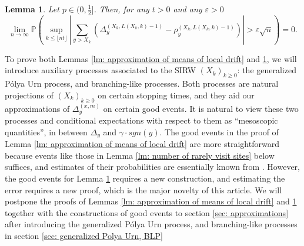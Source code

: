 \documentclass[twoside,12pt, a4paper]{article}
\newtheorem{lemma}{Lemma}[section]
\numberwithin{equation}{section}
\theoremstyle{remark}
\newcommand{\abs}[1]{\left\vert #1 \right\vert}
\newcommand{\edt}[1]{\textcolor{red}{#1}} %
\begin{document}
	\begin{lemma}\label{lm: approx local drift by conditional means}
		Let $p\in (0,\frac{1}{2}]$. Then, for any $t>0$ and any $\varepsilon >0$
		\begin{equation}\label{eq: control of martingale difference for local drift}
			\lim_{n \to \infty }\mathbb{P}\left(\sup_{k\leq\lfloor nt \rfloor} \abs{\sum_{y> X_k} \left(\Delta_{y}^{(X_k,L(X_k,k)-1)}- \rho_{y}^{(X_k,L(X_k,k)-1)} \right)   }  > \varepsilon \sqrt{n}  \right) =0. 
		\end{equation}
	\end{lemma}
	
	
	
	To prove both Lemmas \ref{lm: approximation of means of local drift} and \ref{lm: approx local drift by conditional means}, we will introduce auxiliary processes associated to the SIRW $(X_k)_{k\geq 0}$: the generalized P\'{o}lya Urn process, and branching-like processes. Both processes are natural projections of $(X_k)_{k\geq 0}$ on certain stopping times, and they aid our approximations of $\Delta_{y}^{(x,m)}$ on certain good events. 
	It is natural to view these two processes and conditional expectations with respect to them as ``mesoscopic quantities'', in between $\Delta_y$ and $\gamma\cdot sgn(y)$.
	The good events in the proof of Lemma \ref{lm: approximation of means of local drift} are more straightforward because events like those in Lemma \ref{lm: number of rarely visit sites} below suffices, and estimates of their probabilities are essentially known from \cite{KMP23}. However, the good events for Lemma \ref{lm: approx local drift by conditional means} requires a new construction, and estimating the error requires a new proof, which is the major novelty of this article. We will postpone the proofs of Lemmas \ref{lm: approximation of means of local drift} and \ref{lm: approx local drift by conditional means} together with the constructions of good events to section \ref{sec: approximations} after introducing the generalized P\'{o}lya Urn process, and branching-like processes in section \ref{sec: generalized Polya Urn, BLP}
	
\end{document}
